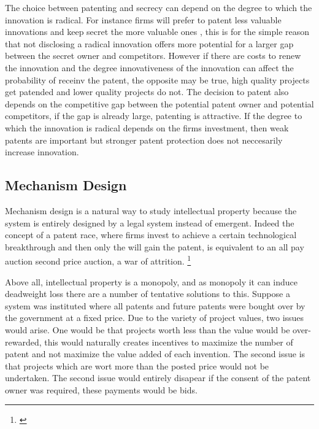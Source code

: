 \documentclass[12pt]{article}
\numberwithin{equation}{section}
\begin{document}
The choice between patenting and secrecy can depend on the degree to which the innovation is radical. For instance firms will prefer to patent less valuable innovations and keep secret the more valuable ones \cite{Anton2004} , this is for the simple reason that not disclosing a radical innovation offers more potential for a larger gap between the secret owner and competitors. However if there are costs to renew the innovation and the degree innovativeness of the innovation can affect the probability of receinv the patent, the opposite may be true, high quality projects get patended and lower quality projects do not\cite{Mose2011}. The decision to patent also depends on the competitive gap between the potential patent owner and potential competitors, if the gap is already large, patenting is attractive. If the degree to which the innovation is radical depends on the firms investment, then weak patents are important but stronger patent protection does not neccesarily increase innovation\cite{Kultti2006}. %

\subsection{Mechanism Design}

Mechanism design is a natural way to study intellectual property because the system is entirely designed by a legal system instead of emergent. Indeed the concept of a patent race, where firms invest to achieve a certain technological breakthrough and then only the will gain the patent, is equivalent to an all pay auction second price auction, a war of attrition. \footnote{ \cite{Games2003} }

Above all, intellectual property is a monopoly, and as monopoly it can induce deadweight loss there are a number of tentative solutions to this. Suppose a system was instituted where all patents and future patents were bought over by the government at a fixed price. Due to the variety of project values, two issues would arise. One would be that projects worth less than the value would be over-rewarded, this would naturally creates incentives to maximize the number of patent and not maximize the value added of each invention. The second issue is that projects which are wort more than the posted price would not be undertaken. The second issue would entirely disapear if the consent of the patent owner was required, these payments would be bids.  
\end{document}
